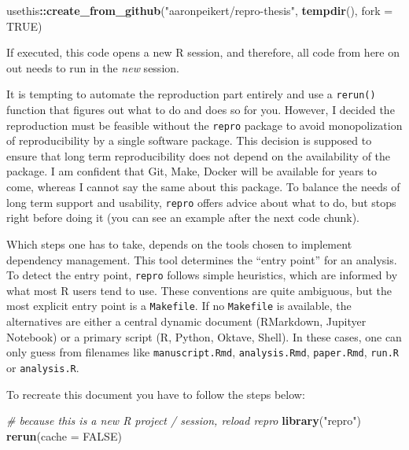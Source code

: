 \documentclass[12pt,a4paper,twoside]{article}
\newenvironment{Shaded}{\begin{snugshade}}{\end{snugshade}}
\newcommand{\CommentTok}[1]{\textcolor[rgb]{0.56,0.35,0.01}{\textit{#1}}}
\newcommand{\DataTypeTok}[1]{\textcolor[rgb]{0.13,0.29,0.53}{#1}}
\newcommand{\KeywordTok}[1]{\textcolor[rgb]{0.13,0.29,0.53}{\textbf{#1}}}
\newcommand{\NormalTok}[1]{#1}
\newcommand{\OperatorTok}[1]{\textcolor[rgb]{0.81,0.36,0.00}{\textbf{#1}}}
\newcommand{\OtherTok}[1]{\textcolor[rgb]{0.56,0.35,0.01}{#1}}
\newcommand{\StringTok}[1]{\textcolor[rgb]{0.31,0.60,0.02}{#1}}
\begin{document}
\begin{Shaded}
\begin{Highlighting}[]
\NormalTok{usethis}\OperatorTok{::}\KeywordTok{create_from_github}\NormalTok{(}\StringTok{"aaronpeikert/repro-thesis"}\NormalTok{,}
                            \KeywordTok{tempdir}\NormalTok{(),}
                            \DataTypeTok{fork =} \OtherTok{TRUE}\NormalTok{)}
\end{Highlighting}
\end{Shaded}

If executed, this code opens a new R session, and therefore, all code from here on out needs to run in the \emph{new} session.

It is tempting to automate the reproduction part entirely and use a \texttt{rerun()} function that figures out what to do and does so for you.
However, I decided the reproduction must be feasible without the \texttt{repro} package to avoid monopolization of reproducibility by a single software package.
This decision is supposed to ensure that long term reproducibility does not depend on the availability of the package.
I am confident that Git, Make, Docker will be available for years to come, whereas I cannot say the same about this package.
To balance the needs of long term support and usability, \texttt{repro} offers advice about what to do, but stops right before doing it (you can see an example after the next code chunk).

Which steps one has to take, depends on the tools chosen to implement dependency management.
This tool determines the ``entry point'' for an analysis.
To detect the entry point, \texttt{repro} follows simple heuristics, which are informed by what most R users tend to use.
These conventions are quite ambiguous, but the most explicit entry point is a \texttt{Makefile}.
If no \texttt{Makefile} is available, the alternatives are either a central dynamic document (RMarkdown, Jupityer Notebook) or a primary script (R, Python, Oktave, Shell).
In these cases, one can only guess from filenames like \texttt{manuscript.Rmd}, \texttt{analysis.Rmd}, \texttt{paper.Rmd}, \texttt{run.R} or \texttt{analysis.R}.

To recreate this document you have to follow the steps below:

\begin{Shaded}
\begin{Highlighting}[]
\CommentTok{# because this is a new R project / session, reload repro}
\KeywordTok{library}\NormalTok{(}\StringTok{"repro"}\NormalTok{)}
\KeywordTok{rerun}\NormalTok{(}\DataTypeTok{cache =} \OtherTok{FALSE}\NormalTok{)}
\end{Highlighting}
\end{Shaded}
\end{document}
